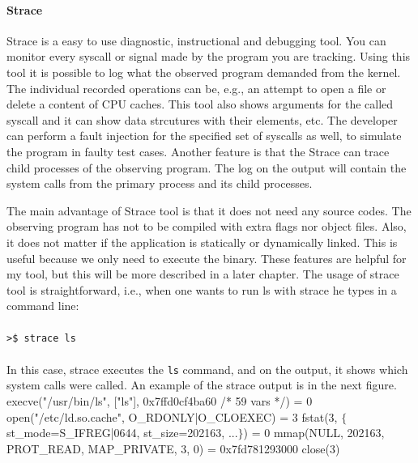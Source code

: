 \paragraph{Strace}
\label{sec:strace}

Strace \cite{strace_man} is a easy to use diagnostic, instructional and debugging tool.
You can monitor every syscall or signal made by the program you are tracking.
Using this tool it is possible to log what the observed program demanded from the kernel.
The individual recorded operations can be, e.g., an attempt to open a file or delete a content of CPU caches.
This tool also shows arguments for the called syscall and it can show data strcutures with their elements, etc.
The developer can perform a fault injection for the specified set of syscalls as well, to simulate the program in faulty test cases.
Another feature is that the Strace can trace child processes of the observing program.
The log on the output will contain the system calls from the primary process and its child processes.

The main advantage of Strace tool is that it does not need any source codes.
The observing program has not to be compiled with extra flags nor object files.
Also, it does not matter if the application is statically or dynamically linked.
This is useful because we only need to execute the binary.
These features are helpful for my tool, but this will be more described in a later chapter.
The usage of strace tool is straightforward, i.e., when one wants to run ls with strace he types in a command line:\\
\\
\texttt{>\$ strace ls}\\
\\
In this case, strace executes the \texttt{ls} command, and on the output, it shows which system calls were called.
An example of the strace output is in the next figure.\\[2mm]

\selectfont\noindent
execve("/usr/bin/ls", ["ls"], 0x7ffd0cf4ba60 /* 59 vars */) = 0\linebreak
open("/etc/ld.so.cache", O\_RDONLY|O\_CLOEXEC) = 3\linebreak
fstat(3, $\{$ st\_mode=S\_IFREG|0644, st\_size=202163, ...$\}$) = 0\linebreak
mmap(NULL, 202163, PROT\_READ, MAP\_PRIVATE, 3, 0) = 0x7fd781293000\linebreak
close(3)\linebreak
\fontfamily{\familydefault}\selectfont

